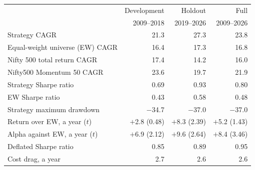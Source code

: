 \begin{tabular}{@{}lrrr@{}}
\toprule
 & Development & Holdout & Full \\
 & 2009--2018 & 2019--2026 & 2009--2026 \\
\midrule
Strategy CAGR & 21.3 & 27.3 & 23.8 \\
Equal-weight universe (EW) CAGR & 16.4 & 17.3 & 16.8 \\
Nifty 500 total return CAGR & 17.4 & 14.2 & 16.0 \\
Nifty500 Momentum 50 CAGR & 23.6 & 19.7 & 21.9 \\
Strategy Sharpe ratio & 0.69 & 0.93 & 0.80 \\
EW Sharpe ratio & 0.43 & 0.58 & 0.48 \\
Strategy maximum drawdown & $-$34.7 & $-$37.0 & $-$37.0 \\
Return over EW, a year ($t$) & $+$2.8 (0.48) & $+$8.3 (2.39) & $+$5.2 (1.43) \\
Alpha against EW, a year ($t$) & $+$6.9 (2.12) & $+$9.6 (2.64) & $+$8.4 (3.46) \\
Deflated Sharpe ratio & 0.85 & 0.89 & 0.95 \\
Cost drag, a year & 2.7 & 2.6 & 2.6 \\
\bottomrule
\end{tabular}
